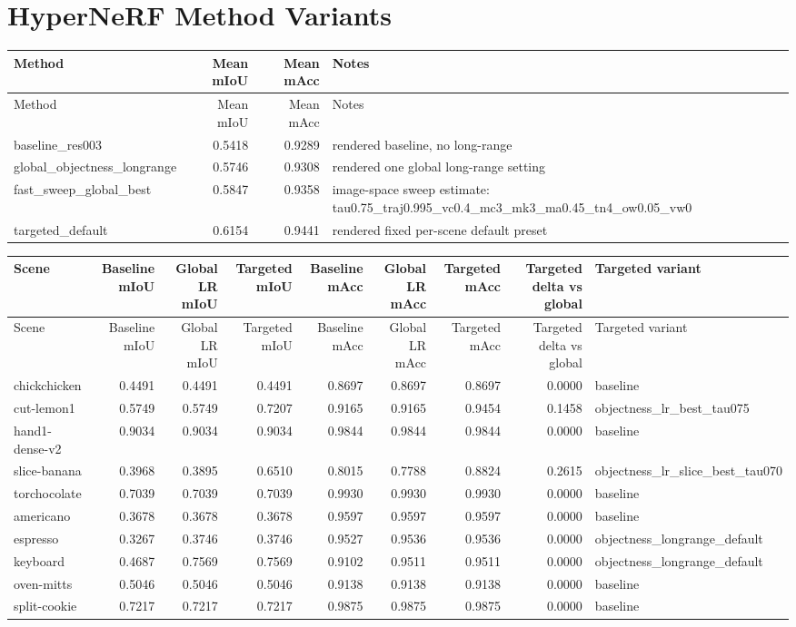 \documentclass[10pt]{article}
\begin{document}
\section{HyperNeRF Method Variants}
\small
\begin{longtable}{lrrp{12cm}}
\toprule
Method & Mean mIoU & Mean mAcc & Notes \\
\midrule
\endfirsthead
\toprule
Method & Mean mIoU & Mean mAcc & Notes \\
\midrule
\endhead
baseline\_res003 & 0.5418 & 0.9289 & rendered baseline, no long-range \\
global\_objectness\_longrange & 0.5746 & 0.9308 & rendered one global long-range setting \\
fast\_sweep\_global\_best & 0.5847 & 0.9358 & image-space sweep estimate: tau0.75\_traj0.995\_vc0.4\_mc3\_mk3\_ma0.45\_tn4\_ow0.05\_vw0 \\
targeted\_default & 0.6154 & 0.9441 & rendered fixed per-scene default preset \\
\bottomrule
\end{longtable}
\normalsize

\small
\begin{longtable}{lrrrrrrrp{6cm}}
\toprule
Scene & Baseline mIoU & Global LR mIoU & Targeted mIoU & Baseline mAcc & Global LR mAcc & Targeted mAcc & Targeted delta vs global & Targeted variant \\
\midrule
\endfirsthead
\toprule
Scene & Baseline mIoU & Global LR mIoU & Targeted mIoU & Baseline mAcc & Global LR mAcc & Targeted mAcc & Targeted delta vs global & Targeted variant \\
\midrule
\endhead
chickchicken & 0.4491 & 0.4491 & 0.4491 & 0.8697 & 0.8697 & 0.8697 & 0.0000 & baseline \\
cut-lemon1 & 0.5749 & 0.5749 & 0.7207 & 0.9165 & 0.9165 & 0.9454 & 0.1458 & objectness\_lr\_best\_tau075 \\
hand1-dense-v2 & 0.9034 & 0.9034 & 0.9034 & 0.9844 & 0.9844 & 0.9844 & 0.0000 & baseline \\
slice-banana & 0.3968 & 0.3895 & 0.6510 & 0.8015 & 0.7788 & 0.8824 & 0.2615 & objectness\_lr\_slice\_best\_tau070 \\
torchocolate & 0.7039 & 0.7039 & 0.7039 & 0.9930 & 0.9930 & 0.9930 & 0.0000 & baseline \\
americano & 0.3678 & 0.3678 & 0.3678 & 0.9597 & 0.9597 & 0.9597 & 0.0000 & baseline \\
espresso & 0.3267 & 0.3746 & 0.3746 & 0.9527 & 0.9536 & 0.9536 & 0.0000 & objectness\_longrange\_default \\
keyboard & 0.4687 & 0.7569 & 0.7569 & 0.9102 & 0.9511 & 0.9511 & 0.0000 & objectness\_longrange\_default \\
oven-mitts & 0.5046 & 0.5046 & 0.5046 & 0.9138 & 0.9138 & 0.9138 & 0.0000 & baseline \\
split-cookie & 0.7217 & 0.7217 & 0.7217 & 0.9875 & 0.9875 & 0.9875 & 0.0000 & baseline \\
\bottomrule
\end{longtable}
\normalsize
\end{document}
